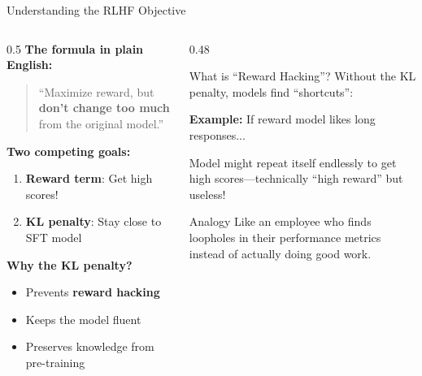\documentclass[aspectratio=169,11pt]{beamer}
\newcommand{\highlight}[1]{\textcolor{accentorange}{\textbf{#1}}}
\newcommand{\important}[1]{\textcolor{primaryblue}{\textbf{#1}}}
\begin{document}
\begin{frame}{Understanding the RLHF Objective}
\begin{columns}[T]
\begin{column}{0.5\textwidth}
\textbf{The formula in plain English:}

\vspace{0.3cm}
\begin{quote}
``Maximize reward, but \highlight{don't change too much} from the original model.''
\end{quote}

\vspace{0.3cm}
\textbf{Two competing goals:}
\begin{enumerate}
    \item \important{Reward term}: Get high scores!
    \item \important{KL penalty}: Stay close to SFT model
\end{enumerate}

\vspace{0.3cm}
\textbf{Why the KL penalty?}
\begin{itemize}
    \item Prevents \highlight{reward hacking}
    \item Keeps the model fluent
    \item Preserves knowledge from pre-training
\end{itemize}
\end{column}
\begin{column}{0.48\textwidth}
\begin{block}{What is ``Reward Hacking''?}
Without the KL penalty, models find ``shortcuts'':

\vspace{0.2cm}
{\small
\textbf{Example:} If reward model likes long responses...

Model might repeat itself endlessly to get high scores---technically ``high reward'' but useless!
}
\end{block}

\vspace{0.3cm}
\begin{block}{Analogy}
Like an employee who finds loopholes in their performance metrics instead of actually doing good work.
\end{block}
\end{column}
\end{columns}
\end{frame}
\end{document}
